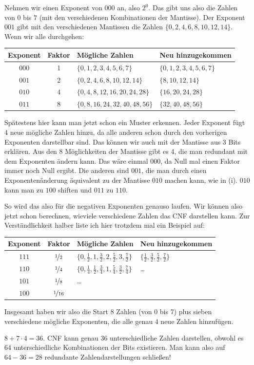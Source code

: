 \documentclass{scrartcl}
\begin{document}
{{			Nehmen wir einen Exponent von $000$ an, also $2^0$. Das gibt uns also die Zahlen von $0$ bis $7$ (mit den verschiedenen Kombinationen der Mantisse). Der Exponent $001$ gibt mit den verschiedenen Mantissen die Zahlen $\{0, 2, 4, 6, 8, 10, 12, 14\}$. Wenn wir alle durchgehen:
			\begin{table}[H]
				\centering
				\label{table:numbers}
				\begin{tabular}{ccll}
					Exponent & Faktor & Mögliche Zahlen & Neu hinzugekommen\\ \toprule
					$000$ & 1 & $\{0, 1, 2, 3, 4, 5, 6, 7\}$ & $\{0, 1, 2, 3, 4, 5, 6, 7\}$\\
					$001$ & 2 & $\{0, 2, 4, 6, 8, 10, 12, 14\}$ & $\{8, 10, 12, 14\}$\\
					$010$ & 4 & $\{0, 4, 8, 12, 16, 20, 24, 28\}$ & $\{16, 20, 24, 28\}$\\
					$011$ & 8 & $\{0, 8, 16, 24, 32, 40, 48, 56\}$ & $\{32, 40, 48, 56\}$
				\end{tabular}
			\end{table}
			Spätestens hier kann man jetzt schon ein Muster erkennen. Jeder Exponent fügt 4 neue mögliche Zahlen hinzu, da alle anderen schon durch den vorherigen Exponenten darstellbar sind. Das können wir auch mit der Mantisse aus 3 Bits erklären. Aus den 8 Möglichkeiten der Mantisse gibt es 4, die man redundant mit dem Exponenten ändern kann. Das wäre einmal $000$, da Null mal einen Faktor immer noch Null ergibt. Die anderen sind $001$, die man durch einen Exponentenänderung äquivalent zu der Mantisse $010$ machen kann, wie in (i). $010$ kann man zu $100$ shiften und $011$ zu $110$.
			
			So wird das also für die negativen Exponenten genauso laufen. Wir können also jetzt schon berechnen, wieviele verschiedene Zahlen das CNF darstellen kann. Zur Verständlichkeit halber liste ich hier trotzdem mal ein Beispiel auf:
			\begin{table}[H]
				\centering
				\label{table:numbers2}
				\begin{tabular}{ccll}
					Exponent & Faktor & Mögliche Zahlen & Neu hinzugekommen\\ \toprule
					$111$ & $\nicefrac{1}{2}$ & $\{0, \frac{1}{2}, 1, \frac{3}{2}, 2, \frac{5}{2}, 3, \frac{7}{2}\}$ & $\{\frac{1}{2}, \frac{3}{2}, \frac{5}{2}, \frac{7}{2}\}$\\
					$110$ & $\nicefrac{1}{4}$ & $\{0, \frac{1}{4}, \frac{1}{2}, \frac{3}{4}, 1, \frac{5}{4}, \frac{3}{2}, \frac{7}{4}\}$ & \dots \\
					$101$ & $\nicefrac{1}{8}$ & \dots & \\
					$100$ & $\nicefrac{1}{16}$ & &
				\end{tabular}
			\end{table}
			Insgesamt haben wir also die Start 8 Zahlen (von 0 bis 7) plus sieben verschiedene mögliche Exponenten, die alle genau 4 neue Zahlen hinzufügen.
			
			$8 + 7 \cdot 4 = 36$. CNF kann genau $36$ unterschiedliche Zahlen darstellen, obwohl es  $64$ unterschiedliche Kombinationen der Bits existieren. Man kann also auf $64-36 = 28$ redundante Zahlendarstellungen schließen!
		}
	}
\end{document}
